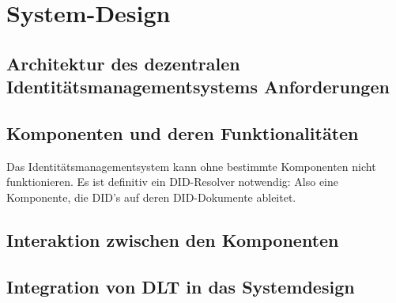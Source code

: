 \chapter{System-Design}
\label{cha:systemdesign}

\section{Architektur des dezentralen Identitätsmanagementsystems Anforderungen}
\blindtext

\section{Komponenten und deren Funktionalitäten}
Das Identitätsmanagementsystem kann ohne bestimmte Komponenten nicht funktionieren. Es ist definitiv ein DID-Resolver notwendig: Also eine Komponente, die DID's auf deren DID-Dokumente ableitet.

\section{Interaktion zwischen den Komponenten}
\blindtext

\section{Integration von DLT in das Systemdesign}
\blindtext
